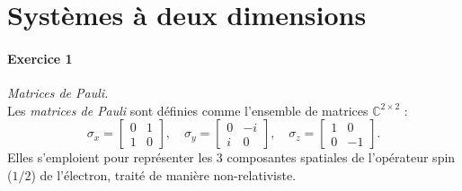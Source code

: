 \section{Systèmes à deux dimensions}

\paragraph{Exercice 1} \textit{Matrices de Pauli.} \\
Les \textit{matrices de Pauli} sont définies comme l'ensemble de matrices $\mathbb{C}^{2\times 2}$ :
\begin{equation}
\sigma_x = \left[ 
\begin{array}{cc}
0 & 1 \\ 
1 & 0
\end{array} 
\right], \quad
\sigma_y = \left[ 
\begin{array}{cc}
0 & -i \\ 
i & 0
\end{array} 
\right], \quad
\sigma_z = \left[ 
\begin{array}{cc}
1 & 0 \\ 
0 & -1
\end{array} 
\right].
\end{equation}
Elles s'emploient pour représenter les 3 composantes spatiales de l'opérateur spin ($1/2$) de l'électron, traité de manière non-relativiste. 
